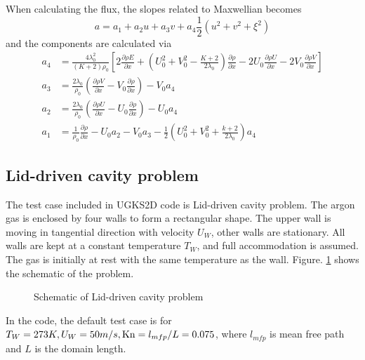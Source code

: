 \documentclass[a4paper]{book}
\begin{document}
When calculating the flux, the slopes related to Maxwellian becomes
$$a=a_1+a_2u+a_3v+a_4\frac{1}{2}(u^2+v^2+\xi^2)$$
and the components are calculated via
$$
\begin{aligned}
    a_4&=\frac{4\lambda_0^2}{(K+2)\rho_0}\left[2\frac{\partial\rho E}{\partial x}+\left(U_0^2+V_0^2-\frac{K+2}{2\lambda_0}\right)\frac{\partial\rho}{\partial x}-2U_0\frac{\partial\rho U}{\partial x}-2V_0\frac{\partial\rho V}{\partial x}\right]\\
    a_3&=\frac{2\lambda_0}{\rho_0}\left(\frac{\partial\rho V}{\partial x}-V_0\frac{\partial\rho}{\partial x}\right)-V_0a_4\\
    a_2&=\frac{2\lambda_0}{\rho_0}\left(\frac{\partial\rho U}{\partial x}-U_0\frac{\partial\rho}{\partial x}\right)-U_0a_4\\
    a_1&=\frac{1}{\rho_0}\frac{\partial\rho}{\partial x}-U_0a_2-V_0a_3-\frac{1}{2}\left(U_0^2+V_0^2+\frac{k+2}{2\lambda_0}\right)a_4
\end{aligned}
$$

\subsection{Lid-driven cavity problem}
The test case included in UGKS2D code is Lid-driven cavity problem. The argon gas is enclosed by four walls to form a rectangular shape. The upper wall is moving in tangential direction with velocity $U_W$, other walls are stationary. All walls are kept at a constant temperature $T_W$, and full accommodation is assumed. The gas is initially at rest with the same temperature as the wall.  Figure. \ref{pic:cavity} shows the schematic of the problem.

\begin{figure}[htb!]
    \centering
    \caption{Schematic of Lid-driven cavity problem}
    \label{pic:cavity}
\end{figure}

In the code, the default test case is for $T_W = 273K, U_W=50m/s, {\rm Kn} = l_{mfp}/{L} = 0.075$, where $l_{mfp}$ is mean free path and $L$ is the domain length.
\end{document}
